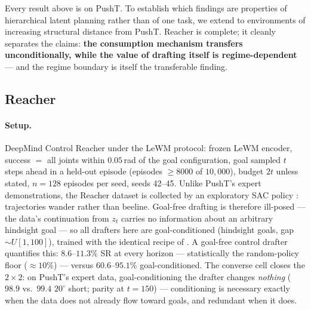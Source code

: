 \documentclass{article}
\newcommand{\degc}[1]{$#1^\circ$}
\begin{document}
Every result above is on PushT. To establish which findings are properties of
hierarchical latent planning rather than of one task, we extend to environments of
increasing structural distance from PushT. Reacher is complete; it cleanly separates
the claims: \textbf{the consumption mechanism transfers unconditionally, while the value
of drafting itself is regime-dependent} --- and the regime boundary is itself the
transferable finding.

\subsection{Reacher}
\label{sec:reacher}

\paragraph{Setup.} DeepMind Control Reacher under the LeWM protocol: frozen LeWM
encoder, success $=$ all joints within $0.05$\,rad of the goal configuration, goal
sampled $t$ steps ahead in a held-out episode (episodes ${\geq}8000$ of $10{,}000$),
budget $2t$ unless stated, $n{=}128$ episodes per seed, seeds 42--45. Unlike PushT's
expert demonstrations, the Reacher dataset is collected by an exploratory SAC policy
\citep{lewm}: trajectories wander rather than beeline. Goal-free drafting is therefore
ill-posed --- the data's continuation from $z_t$ carries no information about an
arbitrary hindsight goal --- so all drafters here are goal-conditioned (hindsight goals,
gap ${\sim}U[1,100]$), trained with the identical recipe of . A
goal-free control drafter quantifies this: $8.6$--$11.3\%$ SR at every horizon ---
statistically the random-policy floor ($\approx10\%$) --- versus $60.6$--$95.1\%$
goal-conditioned. The converse cell closes the $2{\times}2$: on PushT's expert data,
goal-conditioning the drafter changes \emph{nothing} ($98.9$ vs.\ $99.4$ \degc{20}
short; parity at $t{=}150$) --- conditioning is necessary exactly when the data does
not already flow toward goals, and redundant when it does.
\end{document}
